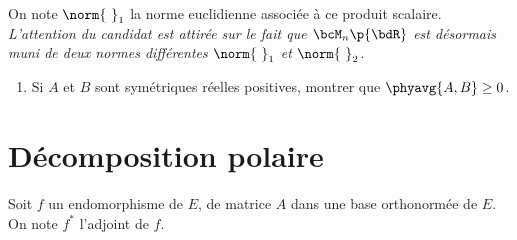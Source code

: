 \documentclass[a4paper,french,bookmarks]{article}
\begin{document}
    On note $\norm{\ }_1$ la norme euclidienne associée à ce produit scalaire. \emph{L'attention du candidat est attirée sur le fait que $\bcM_n\p{\bdR}$ est désormais muni de deux normes différentes $\norm{\ }_1$ et $\norm{\ }_2$.}
    
    \begin{enumerate}[resume]
        \item Si $A$ et $B$ sont symétriques réelles positives, montrer que $\phyavg{A, B} \geq 0$.
        
        \noafter
        \nobefore\yesafter
        \yesafter
    \end{enumerate}
    
    \section{Décomposition polaire}
    
    Soit $f$ un endomorphisme de $E$, de matrice $A$ dans une base orthonormée de $E$. On note $f^*$ l'adjoint de $f$.
    
\end{document}
